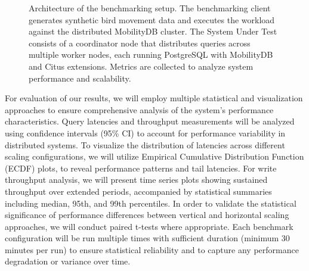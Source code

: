 \documentclass{article}
\begin{document}
\begin{figure}[ht]
    \caption{
	Architecture of the benchmarking setup. 
	The benchmarking client generates synthetic bird movement data and executes the workload against 
	the distributed MobilityDB cluster. 
	The System Under Test consists of a coordinator node that distributes queries across multiple worker nodes,
	each running PostgreSQL with MobilityDB and Citus extensions. 
	Metrics are collected to analyze system performance and scalability.
    }
    \label{fig:image}
\end{figure}

For evaluation of our results, we will employ multiple statistical and visualization approaches to ensure
comprehensive analysis of the system's performance characteristics. Query latencies and throughput measurements
will be analyzed using confidence intervals (95\% CI) to account for performance variability in distributed systems. 
To visualize the distribution of latencies across different scaling configurations, we will utilize Empirical
Cumulative Distribution Function (ECDF) plots, to reveal performance patterns and tail latencies.
For write throughput analysis, we will present time series plots showing sustained throughput over extended
periods, accompanied by statistical summaries including median, 95th, and 99th percentiles.
In order to validate the statistical significance of performance differences between vertical and horizontal scaling
approaches, we will conduct paired t-tests where appropriate.
Each benchmark configuration will be run multiple times with sufficient duration (minimum 30 minutes per run)
to ensure statistical reliability and to capture any performance degradation or variance over time.
\end{document}
